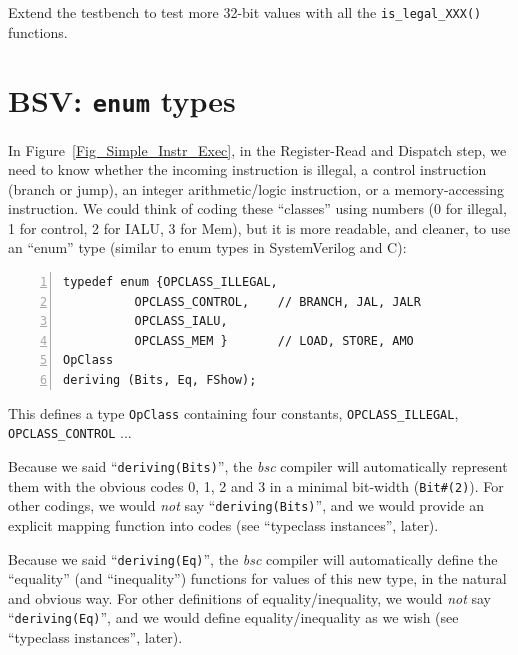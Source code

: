 \Exercise

Extend the testbench to test more 32-bit values with all the
\verb|is_legal_XXX()| functions.

\Endexercise


\section{BSV: {\tt enum} types}

\label{BSV_enum_types}


In Figure~\ref{Fig_Simple_Instr_Exec}, in the Register-Read
and Dispatch step, we need to know whether the incoming instruction is
illegal, a control instruction (branch or jump), an integer
arithmetic/logic instruction, or a memory-accessing instruction.  We
could think of coding these ``classes'' using numbers (0 for illegal,
1 for control, 2 for IALU, 3 for Mem), but it is more readable, and
cleaner, to use an ``enum'' type (similar to enum types in
SystemVerilog and C):

\begin{Verbatim}[frame=single, numbers=left]
typedef enum {OPCLASS_ILLEGAL,
	      OPCLASS_CONTROL,    // BRANCH, JAL, JALR
	      OPCLASS_IALU,
	      OPCLASS_MEM }       // LOAD, STORE, AMO
OpClass
deriving (Bits, Eq, FShow);
\end{Verbatim}

This defines a type \verb|OpClass| containing four constants,
\verb|OPCLASS_ILLEGAL|, \verb|OPCLASS_CONTROL| ...


Because we said ``\verb|deriving(Bits)|'', the \emph{bsc} compiler
will automatically represent them with the obvious codes 0, 1, 2 and 3
in a minimal bit-width (\verb|Bit#(2)|).  For other codings, we would
\emph{not} say ``\verb|deriving(Bits)|'', and we would provide an
explicit mapping function into codes (see ``typeclass instances'',
later).


Because we said ``\verb|deriving(Eq)|'', the \emph{bsc} compiler will
automatically define the ``equality'' (and ``inequality'') functions
for values of this new type, in the natural and obvious way.  For
other definitions of equality/inequality, we would \emph{not} say
``\verb|deriving(Eq)|'', and we would define equality/inequality as we
wish (see ``typeclass instances'', later).

